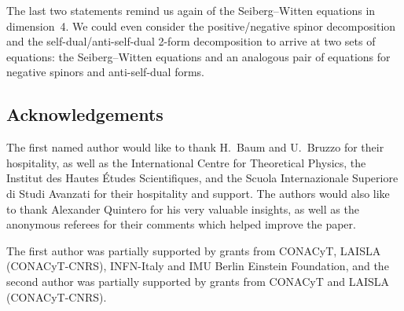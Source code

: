 \documentclass[pdftex]{sigma}
\numberwithin{equation}{section}
\begin{document}
\begin{Remark} The last two statements remind us again of the Seiberg--Witten equations in dimension~4. We could even consider the positive/negative spinor decomposition and the self-dual/anti-self-dual 2-form decomposition to arrive at two sets of equations: the Seiberg--Witten equations and an analogous pair of equations for negative spinors and anti-self-dual forms.
\end{Remark}

\subsection*{Acknowledgements}

The first named author would like to thank H.~Baum and U.~Bruzzo for their hospitality, as well as the International Centre for Theoretical Physics, the Institut des Hautes \'Etudes Scientifiques, and the Scuola Internazionale Superiore di Studi Avanzati for their hospitality and support. The authors would also like to thank Alexander Quintero for his very valuable insights, as well as the anonymous referees for their comments which helped
improve the paper.

The first author was partially supported by grants from CONACyT, LAISLA (CONACyT-CNRS), INFN-Italy and IMU Berlin Einstein Foundation, and the second author was partially supported by grants from CONACyT and LAISLA (CONACyT-CNRS).
\end{document}
